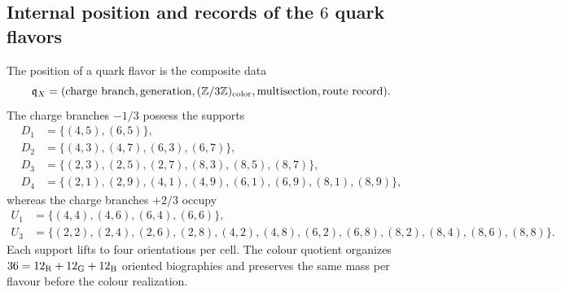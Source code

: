 \subsection{Internal position and records of the \(6\) quark flavors}

The position of a quark flavor is the composite data
\begin{equation}
 \mathfrak q_X=
 (\text{charge branch},\text{generation},(\mathbb Z/3\mathbb Z)_{\rm color},
  \text{multisection},\text{route record}).
 \label{eq:posicion-quark-compuesta-rev2}
\end{equation}
The charge branches \(-1/3\) possess the supports
\begin{align}
 D_1&=\{(4,5),(6,5)\},\nonumber\\
 D_2&=\{(4,3),(4,7),(6,3),(6,7)\},\nonumber\\
 D_3&=\{(2,3),(2,5),(2,7),(8,3),(8,5),(8,7)\},\nonumber\\
 D_4&=\{(2,1),(2,9),(4,1),(4,9),(6,1),(6,9),(8,1),(8,9)\},
 \label{eq:soportes-quark-down-rev2}
\end{align}
whereas the charge branches \(+2/3\) occupy
\begin{align}
 U_1&=\{(4,4),(4,6),(6,4),(6,6)\},\nonumber\\
 U_3&=\{(2,2),(2,4),(2,6),(2,8),(4,2),(4,8),
       (6,2),(6,8),(8,2),(8,4),(8,6),(8,8)\}.
 \label{eq:soportes-quark-up-rev2}
\end{align}
Each support lifts to four orientations per cell. The colour quotient
organizes \(36=12_{\rm R}+12_{\rm G}+12_{\rm B}\) oriented biographies and preserves the same
mass per flavour before the colour realization.


